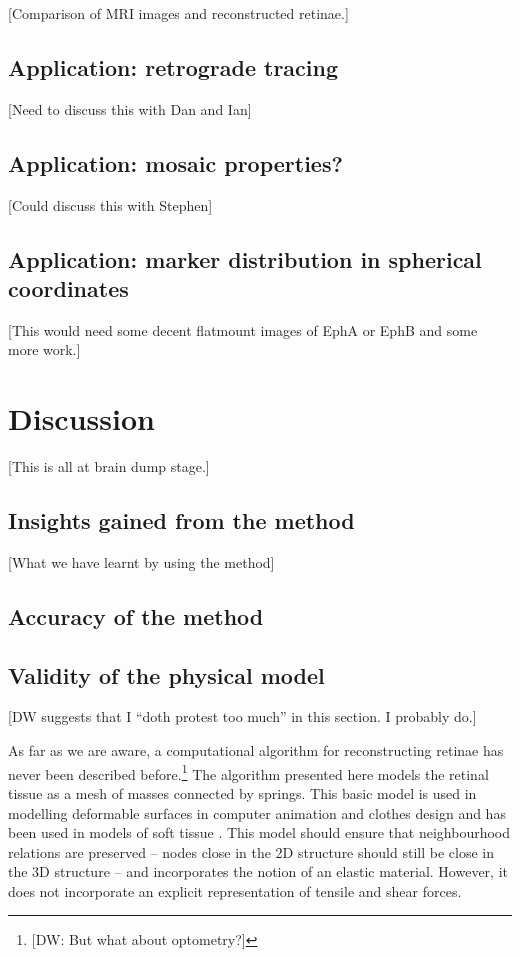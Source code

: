 \documentclass[10pt]{article}
\newcommand{\todo}[1]{{\color{red}[#1]}}
\begin{document}
\todo{Comparison of MRI images and reconstructed retinae.}

\subsection*{Application: retrograde tracing}

\todo{Need to discuss this with Dan and Ian}

\subsection*{Application: mosaic properties?}

\todo{Could discuss this with Stephen}

\subsection*{Application: marker distribution in spherical coordinates}

\todo{This would need some decent flatmount images of EphA or EphB
  and some more work.}

\section*{Discussion}

\todo{This is all at brain dump stage.}

\subsection*{Insights gained from the method}

\todo{What we have learnt by using the method}

\subsection*{Accuracy of the method}

\subsection*{Validity of the physical model}

\todo{DW suggests that I ``doth protest too much'' in this section. I
  probably do.}

As far as we are aware, a computational algorithm for reconstructing
retinae has never been described
before.\footnote{\todo{DW: But what about optometry?}} The algorithm
presented here models the retinal tissue as a mesh of masses connected
by springs. This basic model is used in modelling deformable surfaces
in computer animation and clothes design
\cite{FanEtal98spri,MaCaEtal99flat,WangEtal02surf} and has been used
in models of soft tissue \cite{SkriDunc99real}.  This model should
ensure that neighbourhood relations are preserved -- nodes close in
the 2D structure should still be close in the 3D structure -- and
incorporates the notion of an elastic material. However, it does not
incorporate an explicit representation of tensile and shear forces.
\end{document}
